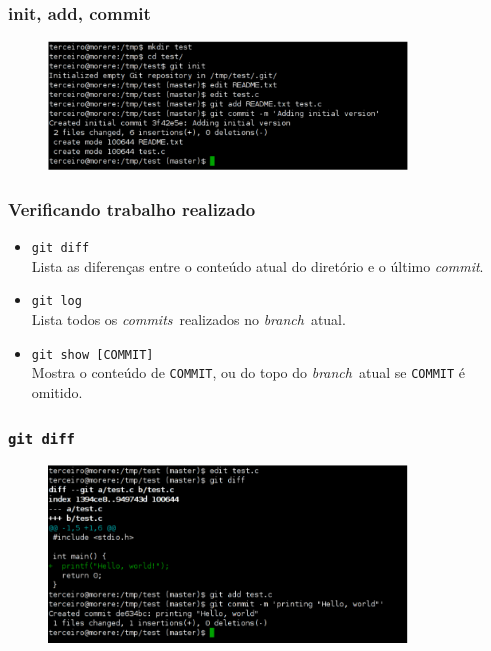 \documentclass{beamer}
\newcommand{\branch}{\emph{branch}}
\newcommand{\commit}{\emph{commit}}
\newcommand{\commits}{\emph{commits}}
\begin{document}
\begin{frame}
  \frametitle{init, add, commit}
  \begin{figure}[h]
    \begin{center}
      \includegraphics[width=0.85\textwidth]{figs/git-screenshot-init-add-commit.pdf}
    \end{center}
    \label{fig:git-init-add-commit}
  \end{figure}
\end{frame}

\begin{frame}
  \frametitle{Verificando trabalho realizado}
  \begin{itemize}

    \item \texttt{git diff}\\
      Lista as diferenças entre o conteúdo atual do diretório e o último
      \commit.
      \pause

    \item \texttt{git log}\\
      Lista todos os \commits\ realizados no \branch\ atual.
      \pause

    \item \texttt{git show [COMMIT]}\\
      Mostra o conteúdo de \texttt{COMMIT}, ou do topo do \branch\ atual
      se \texttt{COMMIT} é omitido.

  \end{itemize}
\end{frame}

\begin{frame}
  \frametitle{\texttt{git diff}}
  \begin{figure}[h]
    \begin{center}
      \includegraphics[width=0.85\textwidth]{figs/git-screenshot-diff.pdf}
    \end{center}
    \label{fig:git-diff}
  \end{figure}
\end{frame}
\end{document}
